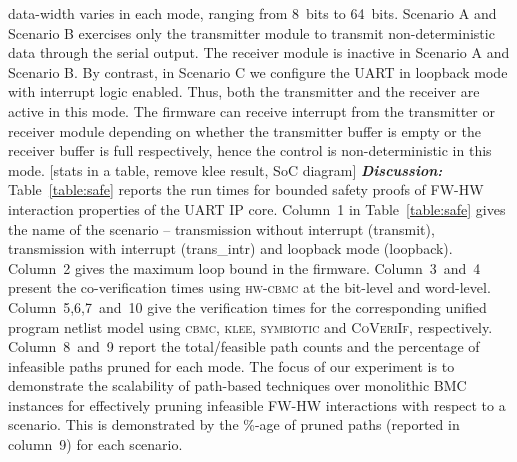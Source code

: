 \documentclass[sigconf]{acmart}
\newcommand{\rmcmt}[1]{{\color{magenta} [{#1}]}}
\newcommand{\tool}[1]{\textsc{#1}\xspace}
\newcommand{\cbmcv}{\tool{cbmc}}
\newcommand{\hwcbmcv}{\tool{hw-cbmc}}
\newcommand{\verifox}{\tool{CoVeriIf}}
\newcommand{\klee}{\tool{klee}}
\begin{document}
data-width varies in each mode, ranging from 8~bits to 64~bits.  Scenario A
and Scenario B exercises only the transmitter module to transmit
non-deterministic data through the serial output.  The receiver module is
inactive in Scenario A and Scenario B.  By contrast, in Scenario C we
configure the UART in loopback mode with interrupt logic enabled.  Thus,
both the transmitter and the receiver are active in this mode.  The firmware
can receive interrupt from the transmitter or receiver module depending on
whether the transmitter buffer is empty or the receiver buffer is full
respectively, hence the control is non-deterministic in this mode.
%
\rmcmt{stats in a table, remove klee result, SoC diagram}
\textbf{\emph{Discussion:}}
Table~\ref{table:safe} reports the run times for bounded safety proofs of
FW-HW interaction properties of the UART IP core.  Column~1 in
Table~\ref{table:safe} gives the name of the scenario -- transmission
without interrupt (transmit), transmission with interrupt (trans\_intr) and
loopback mode (loopback).  Column~2 gives the maximum loop bound in the
firmware.  Column~3~and~4 present the co-verification times using \hwcbmcv
at the bit-level and word-level.  Column~5,6,7~and~10 give the verification
times for the corresponding unified program netlist model using \cbmcv,
\klee, \textsc{symbiotic} and \verifox, respectively.  Column~8~and~9 report
the total/feasible path counts and the percentage of infeasible paths pruned
for each mode.  The focus of our experiment is to demonstrate the
scalability of path-based techniques over monolithic BMC instances for
effectively pruning infeasible FW-HW interactions with respect to a
scenario.  This is demonstrated by the \%-age of pruned paths (reported in
column~9) for each scenario.
\end{document}
